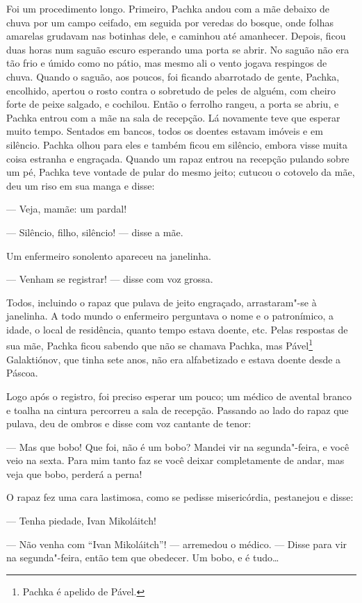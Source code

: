 Foi um procedimento longo. Primeiro, Pachka andou com a mãe debaixo de
chuva por um campo ceifado, em seguida por veredas do bosque, onde
folhas amarelas grudavam nas botinhas dele, e caminhou até amanhecer.
Depois, ficou duas horas num saguão escuro esperando uma porta se abrir.
No saguão não era tão frio e úmido como no pátio, mas mesmo ali o vento
jogava respingos de chuva. Quando o saguão, aos poucos, foi ficando
abarrotado de gente, Pachka, encolhido, apertou o rosto contra o
sobretudo de peles de alguém, com cheiro forte de peixe salgado, e
cochilou. Então o ferrolho rangeu, a porta se abriu, e Pachka entrou com
a mãe na sala de recepção. Lá novamente teve que esperar muito tempo.
Sentados em bancos, todos os doentes estavam imóveis e em silêncio.
Pachka olhou para eles e também ficou em silêncio, embora visse muita
coisa estranha e engraçada. Quando um rapaz entrou na recepção pulando
sobre um pé, Pachka teve vontade de pular do mesmo jeito; cutucou o
cotovelo da mãe, deu um riso em sua manga e disse:

--- Veja, mamãe: um pardal!

--- Silêncio, filho, silêncio! --- disse a mãe.

Um enfermeiro sonolento apareceu na janelinha.

--- Venham se registrar! --- disse com voz grossa.

Todos, incluindo o rapaz que pulava de jeito engraçado, arrastaram"-se à
janelinha. A todo mundo o enfermeiro perguntava o nome e o patronímico,
a idade, o local de residência, quanto tempo estava doente, etc. Pelas
respostas de sua mãe, Pachka ficou sabendo que não se chamava Pachka,
mas Pável\footnote{Pachka é apelido de Pável.} Galaktiónov, que tinha
sete anos, não era alfabetizado e estava doente desde a Páscoa.

Logo após o registro, foi preciso esperar um pouco; um médico de avental
branco e toalha na cintura percorreu a sala de recepção. Passando ao
lado do rapaz que pulava, deu de ombros e disse com voz cantante de
tenor:

--- Mas que bobo! Que foi, não é um bobo? Mandei vir na segunda"-feira, e
você veio na sexta. Para mim tanto faz se você deixar completamente de
andar, mas veja que bobo, perderá a perna!

O rapaz fez uma cara lastimosa, como se pedisse misericórdia, pestanejou
e disse:

--- Tenha piedade, Ivan Mikoláitch!

--- Não venha com ``Ivan Mikoláitch''! --- arremedou o médico. --- Disse
para vir na segunda"-feira, então tem que obedecer. Um bobo, e é tudo\ldots{}


